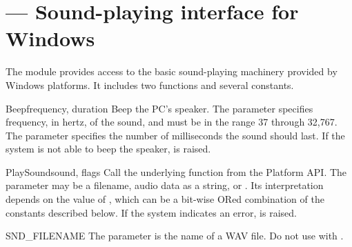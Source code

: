 \section{ ---
         Sound-playing interface for Windows}



The  module provides access to the basic
sound-playing machinery provided by Windows platforms.  It includes
two functions and several constants.


\begin{funcdesc}{Beep}{frequency, duration}
  Beep the PC's speaker.
  The  parameter specifies frequency, in hertz, of the
  sound, and must be in the range 37 through 32,767.
  The  parameter specifies the number of milliseconds the
  sound should last.  If the system is not
  able to beep the speaker,  is raised.
\end{funcdesc}

\begin{funcdesc}{PlaySound}{sound, flags}
  Call the underlying  function from the
  Platform API.  The  parameter may be a filename, audio
  data as a string, or .  Its interpretation depends on the
  value of , which can be a bit-wise ORed combination of
  the constants described below.  If the system indicates an error,
   is raised.
\end{funcdesc}


\begin{datadesc}{SND_FILENAME}
  The  parameter is the name of a WAV file.
  Do not use with .
\end{datadesc}

